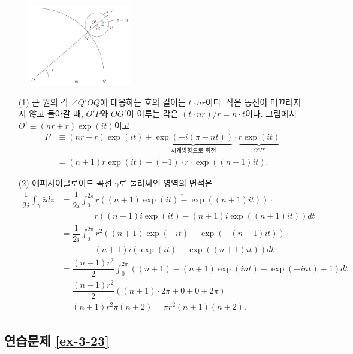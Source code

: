 \begin{figure}[h!]
\begin{center}
\includegraphics[width=0.4\textwidth]{./figs/fig-s-0-10}
\end{center}
\end{figure}

\begin{itemize}
\item[(1)] 큰 원의 각 $\angle Q'OQ$에 대응하는 호의 길이는 $t\cdot nr$이다.
작은 동전이 미끄러지지 않고 돌아갈 때, $O'P$와 $OO'$이 이루는 각은
$(t\cdot nr)/r = n\cdot t$이다. 그림에서 $O' \equiv (nr+r)\exp(it)$이고
\begin{align*}
P & \equiv (nr+r)\exp(it) + 
\underbrace{\exp(-i(\pi-nt))}_{\text{시계방향으로 회전}}\cdot
\underbrace{r\exp(it)}_{O'P'} \\
&=(n+1)r\exp(it) + (-1)\cdot r\cdot \exp((n+1)it).
\end{align*}
\item[(2)] 에피사이클로이드 곡선 $\gamma$로 둘러싸인 영역의 면적은
 \begin{align*}
\dfrac1{2i} \int_\gamma \bar z dz 
&= \dfrac1{2i}\int_0^{2\pi} \overline{r\left( (n+1)\exp(it)-\exp((n+1)it)\right)}\cdot \\
&\qquad\qquad r\left((n+1)i\exp(it) - (n+1)i\exp((n+1)it)\right)dt \\
&= \dfrac1{2i} \int_0^{2\pi} r^2\left( (n+1)\exp(-it) - \exp(-(n+1)it)\right)\cdot  \\
&\qquad\qquad (n+1)i\left(\exp(it) - \exp((n+1)it)\right)dt \\
&= \dfrac{(n+1)r^2}2 \int_0^{2\pi} ((n+1) -(n+1)\exp(int) - \exp(-int) +1)dt \\
&= \dfrac{(n+1)r^2}2 ((n+1) \cdot 2\pi + 0+0 + 2\pi) \\
&= (n+1)r^2\pi(n+2) = \pi r^2 (n+1)(n+2).
\end{align*}
\end{itemize}

\subsection*{연습문제 \ref{ex-3-23}}

